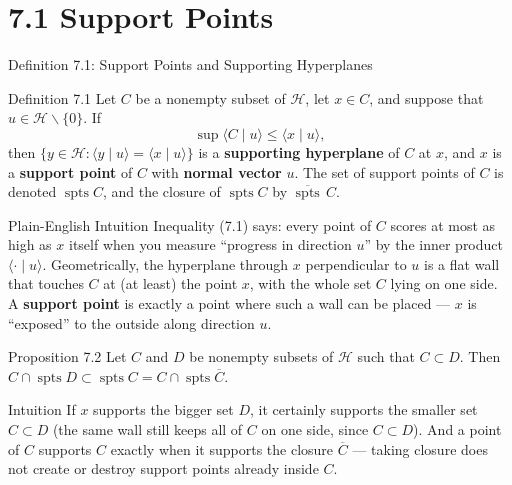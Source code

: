 \documentclass[aspectratio=169,10pt]{beamer}
\DeclareMathOperator{\spts}{spts}
\newcommand{\Hil}{\mathcal{H}}
\newcommand{\ip}[2]{\langle #1 \mid #2 \rangle}
\newcommand{\closure}[1]{\overline{#1}}
\begin{document}
\section{7.1 Support Points}

\begin{frame}[allowframebreaks]{Definition 7.1: Support Points and Supporting Hyperplanes}

  \begin{block}{Definition 7.1}
    Let $C$ be a nonempty subset of $\Hil$, let $x \in C$, and suppose that
    $u \in \Hil \smallsetminus \{0\}$. If
    \[
      \sup \ip{C}{u} \le \ip{x}{u}, \tag{7.1}
    \]
    then $\{y \in \Hil : \ip{y}{u} = \ip{x}{u}\}$ is a \textbf{supporting
    hyperplane} of $C$ at $x$, and $x$ is a \textbf{support point} of $C$
    with \textbf{normal vector} $u$. The set of support points of $C$ is
    denoted $\spts C$, and the closure of $\spts C$ by $\closure{\spts}\,C$.
  \end{block}

  \begin{block}{Plain-English Intuition}
    Inequality (7.1) says: every point of $C$ scores at most as high as $x$
    itself when you measure ``progress in direction $u$'' by the inner
    product $\ip{\cdot}{u}$. Geometrically, the hyperplane through $x$
    perpendicular to $u$ is a flat wall that touches $C$ at (at least) the
    point $x$, with the whole set $C$ lying on one side. A \textbf{support
    point} is exactly a point where such a wall can be placed --- $x$ is
    ``exposed'' to the outside along direction $u$.
  \end{block}

  \framebreak

  \begin{block}{Proposition 7.2}
    Let $C$ and $D$ be nonempty subsets of $\Hil$ such that $C \subset D$.
    Then $C \cap \spts D \subset \spts C = C \cap \spts \closure{C}$.
  \end{block}

  \begin{block}{Intuition}
    If $x$ supports the bigger set $D$, it certainly supports the smaller set
    $C \subset D$ (the same wall still keeps all of $C$ on one side, since
    $C \subset D$). And a point of $C$ supports $C$ exactly when it supports
    the closure $\closure{C}$ --- taking closure does not create or destroy
    support points already inside $C$.
  \end{block}


\end{frame}
\end{document}
